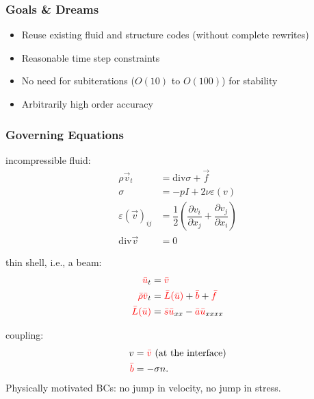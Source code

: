 \documentclass[8pt]{beamer}
\newcommand{\leftd}[1]{{\color{red} \bar{#1}}}
\newcommand{\leftdd}[2]{{\color{red} \bar{#1}(\bar{#2})}}
\newcommand{\divergence}{\mathrm{div}}
\begin{document}
\begin{frame}
    \frametitle{Goals \& Dreams}
    \begin{itemize}
        \item Reuse existing fluid and structure codes (without complete
              rewrites)
        \item Reasonable time step constraints
        \item No need for subiterations (\(O(10)\) to \(O(100)\)) for stability
        \item Arbitrarily high order accuracy
    \end{itemize}
\end{frame}

\begin{frame}
    \frametitle{Governing Equations}
    incompressible fluid:
    \begin{align}
        \rho \vec{v}_t &= \divergence \sigma + \vec{f}                        \\
        \sigma &= -p I + 2 \nu \varepsilon(v)                                 \\
        \varepsilon(\vec{v})_{ij} &= \dfrac{1}{2}
        \left(
        \dfrac{\partial v_i}{\partial x_j} +
        \dfrac{\partial v_j}{\partial x_i}
        \right)                                                               \\
        \divergence \vec{v} &= 0
    \end{align}

    thin shell, i.e., a beam:
    \begin{align}
        \leftd{u}_t              &= \leftd{v}                                 \\
        \leftd{\rho} \leftd{v}_t &= \leftdd{L}{u} + \leftd{b} + \leftd{f}     \\
        \leftdd{L}{u}            &= \leftd{s} \leftd{u}_{xx}
        - \leftd{a} \leftd{u}_{xxxx}
    \end{align}

    \pause
    coupling:
    \begin{align}
        v &= \leftd{v} \text{ (at the interface)}                             \\
        \leftd{b} &= -\sigma n.
    \end{align}
    \pause
    Physically motivated BCs: no jump in velocity, no jump in stress.
\end{frame}
\end{document}
